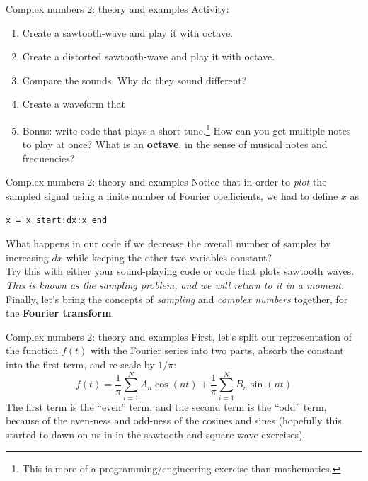 \documentclass{beamer}
\begin{document}
\begin{frame}[fragile]{Complex numbers 2: theory and examples}
Activity:
\begin{enumerate}
\item Create a sawtooth-wave and play it with octave.
\item Create a distorted sawtooth-wave and play it with octave.
\item Compare the sounds.  Why do they sound different?
\item Create a waveform that 
\item \alert{Bonus: write code that plays a short tune.}\footnote{This is more of a programming/engineering exercise than mathematics.}  How can you get multiple notes to play at once?  What is an \textbf{octave}, in the sense of musical notes and frequencies?
\end{enumerate}
\end{frame}

\begin{frame}[fragile]{Complex numbers 2: theory and examples}
\small
Notice that in order to \textit{plot} the sampled signal using a finite number of Fourier coefficients, we had to define $x$ as 
\begin{verbatim}
x = x_start:dx:x_end
\end{verbatim}
What happens in our code if we decrease the overall number of samples by increasing $dx$ while keeping the other two variables constant? \\ \vspace{0.5cm}
Try this with either your sound-playing code or code that plots sawtooth waves.  \textit{This is known as the sampling problem, and we will return to it in a moment.} \\ \vspace{0.5cm}
Finally, let's bring the concepts of \textit{sampling} and \textit{complex numbers} together, for the \textbf{\alert{Fourier transform}}.
\end{frame}

\begin{frame}[fragile]{Complex numbers 2: theory and examples}
First, let's split our representation of the function $f(t)$ with the Fourier series into two parts, absorb the constant into the first term, and re-scale by $1/\pi$:
\begin{equation}
f(t) = \frac{1}{\pi}\sum_{i=1}^N A_n \cos(nt) + \frac{1}{\pi}\sum_{i=1}^N B_n \sin(nt)
\end{equation}
The first term is the ``even'' term, and the second term is the ``odd'' term, because of the even-ness and odd-ness of the cosines and sines (hopefully this started to dawn on us in in the sawtooth and square-wave exercises).
\end{frame}
\end{document}
